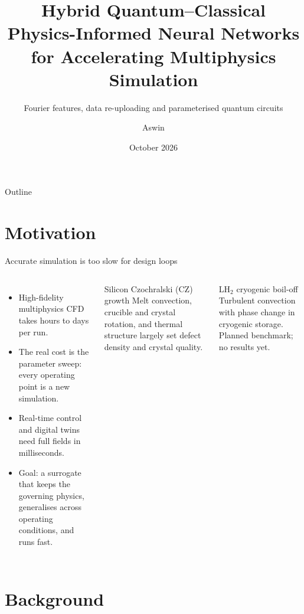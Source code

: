 \documentclass[aspectratio=169]{beamer}
\title{Hybrid Quantum--Classical Physics-Informed Neural Networks\\for Accelerating Multiphysics Simulation}
\subtitle{Fourier features, data re-uploading and parameterised quantum circuits}
\author{Aswin}
\date{October 2026}
\begin{document}
\begin{frame}
\titlepage
\end{frame}

\begin{frame}{Outline}
\tableofcontents
\end{frame}

\section{Motivation}

\begin{frame}{Accurate simulation is too slow for design loops}
\begin{columns}[T,onlytextwidth]
\begin{itemize}
  \item High-fidelity multiphysics CFD takes hours to days per run.
  \item The real cost is the parameter sweep: every operating point is a new simulation.
  \item Real-time control and digital twins need full fields in milliseconds.
  \item Goal: a surrogate that keeps the governing physics, generalises across operating conditions, and runs fast.
\end{itemize}
\begin{block}{Silicon Czochralski (CZ) growth}
Melt convection, crucible and crystal rotation, and thermal structure largely set defect density and crystal quality.
\end{block}
\begin{block}{LH$_2$ cryogenic boil-off}
Turbulent convection with phase change in cryogenic storage. Planned benchmark; no results yet.
\end{block}
\end{columns}
\end{frame}

\section{Background}
\end{document}
